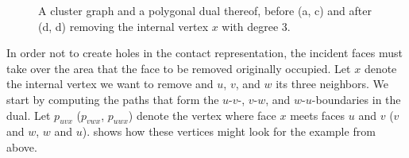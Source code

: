 \begin{figure}[H]
	\centering
	\quad
	\qquad
	\quad
	\caption{A cluster graph and a polygonal dual thereof, before (a, c) and after (d, d) removing the internal vertex $x$ with degree 3.}
	\label{fig:remove-vertex-example-internal}
\end{figure}

In order not to create holes in the contact representation, the incident faces must take over the area that the face to be removed originally occupied. Let $x$ denote the internal vertex we want to remove and $u$, $v$, and $w$ its three neighbors. We start by computing the paths that form the $u$-$v$-, $v$-$w$, and $w$-$u$-boundaries in the dual. Let $p_{uvx}$ ($p_{vwx}$, $p_{uwx}$) denote the vertex where face $x$ meets faces $u$ and $v$ ($v$ and $w$, $w$ and $u$).  shows how these vertices might look for the example from above.

